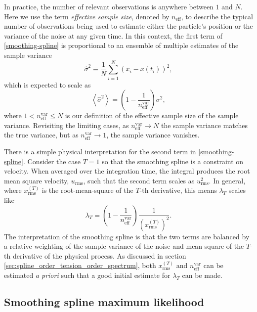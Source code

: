 \documentclass{ametsoc}
\begin{document}
In practice, the number of relevant observations is anywhere between $1$ and $N$. Here we use the term \emph{effective sample size}, denoted by $n_{\textrm{eff}}$, to describe the typical number of observations being used to estimate either the particle's position or the variance of the noise at any given time. In this context, the first term of \eqref{smoothing-spline} is proportional to an ensemble of multiple estimates of the sample variance
\begin{equation}
\label{sample_variance}
\hat{\sigma}^2  \equiv \frac{1}{N} \sum_{i=1}^{N} \left( x_i - x(t_i) \right) ^2,
\end{equation}
which is expected to scale as
\begin{equation}
\label{sample_variance_variance}
\left\langle \hat{\sigma}^2 \right\rangle = \left( 1 -  \frac{1}{n^\textrm{var}_{\textrm{eff}}} \right) \sigma^2,
\end{equation}
where $1 < n^\textrm{var}_{\textrm{eff}} \le N$ is our definition of the effective sample size of the sample variance. Revisiting the limiting cases, as $n^\textrm{var}_{\textrm{eff}} \rightarrow N$ the sample variance matches the true variance, but as $n^\textrm{var}_{\textrm{eff}} \rightarrow 1$, the sample variance vanishes. 

There is a simple physical interpretation for the second term in \eqref{smoothing-spline}. Consider the case $T=1$ so that the smoothing spline is a constraint on velocity. When averaged over the integration time, the integral produces the root mean square velocity, $u_{\textrm{rms}}$, such that the second term scales as $u_{\textrm{rms}}^2$. In general, where $x^{(T)}_{\textrm{rms}}$ is the root-mean-square of the $T$-th derivative, this means $\lambda_T$ scales like
\begin{equation}
\label{lambda}
\lambda_T = \left( 1 -\frac{1}{n^\textrm{var}_{\textrm{eff}}} \right) \frac{1}{ \left(x^{(T)}_{\textrm{rms}}\right)^2}.
\end{equation}
The interpretation of the smoothing spline is that the two terms are balanced by a relative weighting of the sample variance of the noise and mean square of the $T$-th derivative of the physical process. As discussed in section \ref{sec:spline_order_tension_order_spectrum}, both $x^{(T)}_{\textrm{rms}}$ and $n^\textrm{var}_{\textrm{eff}}$ can be estimated \emph{a priori} such that a good initial estimate for $\lambda_T$ can be made.

\subsection{Smoothing spline maximum likelihood}
\label{subsec:maximum_likelihood}
\end{document}
